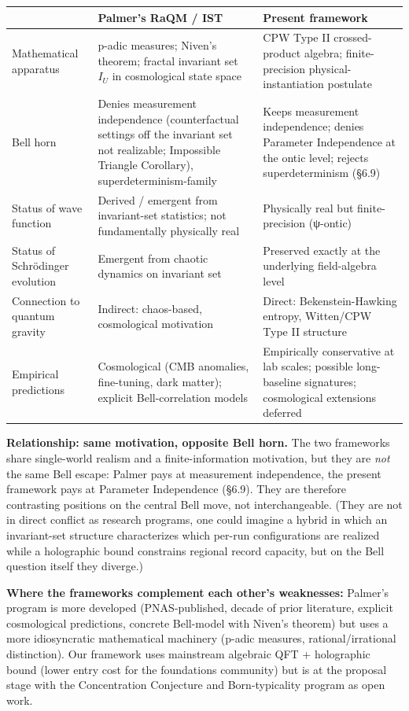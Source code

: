 \documentclass[11pt,a4paper]{article}
\begin{document}
\begin{center}
\small
\begin{tabularx}{\linewidth}{|Y|Y|Y|}
\hline
\textbf{} & \textbf{Palmer's RaQM / IST} & \textbf{Present framework} \\
\hline
Mathematical apparatus & p-adic measures; Niven's theorem; fractal invariant set $I_U$ in cosmological state space & CPW Type II crossed-product algebra; finite-precision physical-instantiation postulate \\
\hline
Bell horn & Denies measurement independence (counterfactual settings off the invariant set not realizable; Impossible Triangle Corollary), superdeterminism-family & Keeps measurement independence; denies Parameter Independence at the ontic level; rejects superdeterminism (§6.9) \\
\hline
Status of wave function & Derived / emergent from invariant-set statistics; not fundamentally physically real & Physically real but finite-precision (ψ-ontic) \\
\hline
Status of Schrödinger evolution & Emergent from chaotic dynamics on invariant set & Preserved exactly at the underlying field-algebra level \\
\hline
Connection to quantum gravity & Indirect: chaos-based, cosmological motivation & Direct: Bekenstein-Hawking entropy, Witten/CPW Type II structure \\
\hline
Empirical predictions & Cosmological (CMB anomalies, fine-tuning, dark matter); explicit Bell-correlation models & Empirically conservative at lab scales; possible long-baseline signatures; cosmological extensions deferred \\
\hline
\end{tabularx}
\end{center}

\textbf{Relationship: same motivation, opposite Bell horn.} The two frameworks share single-world realism and a finite-information motivation, but they are \emph{not} the same Bell escape: Palmer pays at measurement independence, the present framework pays at Parameter Independence (§6.9). They are therefore contrasting positions on the central Bell move, not interchangeable. (They are not in direct conflict as research programs, one could imagine a hybrid in which an invariant-set structure characterizes which per-run configurations are realized while a holographic bound constrains regional record capacity, but on the Bell question itself they diverge.)

\textbf{Where the frameworks complement each other's weaknesses:} Palmer's program is more developed (PNAS-published, decade of prior literature, explicit cosmological predictions, concrete Bell-model with Niven's theorem) but uses a more idiosyncratic mathematical machinery (p-adic measures, rational/irrational distinction). Our framework uses mainstream algebraic QFT + holographic bound (lower entry cost for the foundations community) but is at the proposal stage with the Concentration Conjecture and Born-typicality program as open work.
\end{document}
